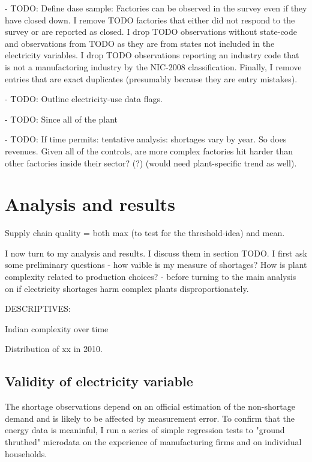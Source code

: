 \documentclass[11pt]{article}
\begin{document}
- TODO: Define dase sample: Factories can be observed in the survey even if they have closed down. I remove TODO factories that either did not respond to the survey or are reported as closed. I drop TODO observations without state-code and observations from TODO as they are from states not included in the electricity variables. I drop TODO observations reporting an industry code that is not a manufactoring industry by the NIC-2008 classification. Finally, I remove entries that are exact duplicates (presumably because they are entry mistakes). 

- TODO: Outline electricity-use data flags.

- TODO: Since all of the plant

- TODO: If time permits: tentative analysis: shortages vary by year. So does revenues. Given all of the controls, are more complex factories hit harder than other factories inside their sector? (?) (would need plant-specific trend as well).


\newpage

\section{Analysis and results}%
\label{sec:analysis_and_results}
Supply chain quality = both max (to test for the threshold-idea) and mean.

I now turn to my analysis and results. I discuss them in section TODO. I first ask some preliminary questions - how vaible is my measure of shortages? How is plant complexity related to production choices? - before turning to the main analysis on if electricity shortages harm complex plants disproportionately. 

DESCRIPTIVES:

Indian complexity over time

Distribution of xx in 2010. 

\subsection{Validity of electricity variable}%
\label{sub:validity_of_electricity_variable}

The shortage observations depend on an official estimation of the non-shortage demand and is likely to be affected by measurement error. To confirm that the energy data is meaninful, I run a series of simple regression tests to "ground thruthed" microdata on the experience of manufacturing firms and on individual households. 
\end{document}
